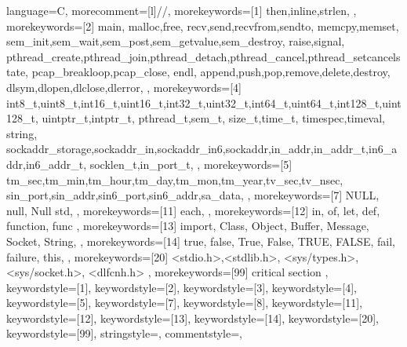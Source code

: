 {%
	language=C,%
	morecomment=[l]{//},%
	morekeywords=[1]{%
		then,inline,strlen,%
	},%
	morekeywords=[2]{%
		main,
		malloc,free,%
		recv,send,recvfrom,sendto,
		memcpy,memset,
		sem_init,sem_wait,sem_post,sem_getvalue,sem_destroy,
		raise,signal,
		pthread_create,pthread_join,pthread_detach,pthread_cancel,pthread_setcancelstate,
		pcap_breakloop,pcap_close,
		endl,
		append,push,pop,remove,delete,destroy,
		dlsym,dlopen,dlclose,dlerror,
	},%
	morekeywords=[4]{%
		int8_t,uint8_t,int16_t,uint16_t,int32_t,uint32_t,int64_t,uint64_t,int128_t,uint128_t,
		uintptr_t,intptr_t,
		pthread_t,sem_t,
		size_t,time_t,
		timespec,timeval,
		string,
		sockaddr_storage,sockaddr_in,sockaddr_in6,sockaddr,in_addr,in_addr_t,in6_addr,in6_addr_t,
		socklen_t,in_port_t,
	},%
	morekeywords=[5]{%
		tm_sec,tm_min,tm_hour,tm_day,tm_mon,tm_year,tv_sec,tv_nsec,
		sin_port,sin_addr,sin6_port,sin6_addr,sa_data,
	},%
	morekeywords=[7]{%
		NULL, null, Null
		std,
	},%
	morekeywords=[11]{%
		each,
	},%
	morekeywords=[12]{%
		in, of, let, def,
		function, func
	},%
	morekeywords=[13]{%
		import,
		Class, Object,
		Buffer, Message,
		Socket, String,
	},%
	morekeywords=[14]{%
		true, false, True, False, TRUE, FALSE,
		fail, failure,
		this,
	},%
	morekeywords=[20]{%
		<stdio.h>,<stdlib.h>,
		<sys/types.h>,<sys/socket.h>,
		<dlfcnh.h>
	},%
	morekeywords=[99]{%
		critical section
	},%
	keywordstyle=[1]\lstCFontBasic,%
	keywordstyle=[2]\lstCFontPredefLib,%
	keywordstyle=[3]\lstCFontFuncCall,%
	keywordstyle=[4]\lstCFontType,%
	keywordstyle=[5]\lstCFontCollection,%
	keywordstyle=[7]\lstCFontSpecialBasic,%
	keywordstyle=[8]\lstCFontSpecialLib,%
	keywordstyle=[11]\lstCFontForeignA,%
	keywordstyle=[12]\lstCFontForeignB,%
	keywordstyle=[13]\lstCFontObject,%
	keywordstyle=[14]\lstCFontMoreKey,%
	keywordstyle=[20]\lstCFontString,%
	keywordstyle=[99]\lstCFontHighRed,%
	stringstyle=\lstCFontString,%
	commentstyle=\lstCFontComment,%
}%

